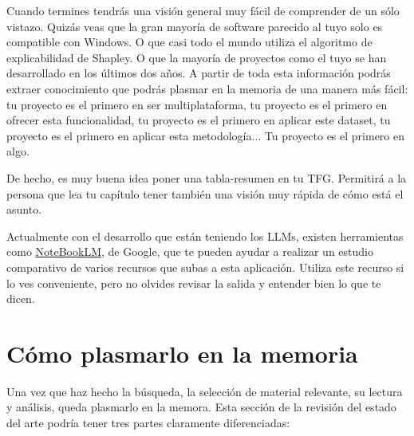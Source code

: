 Cuando termines tendrás una visión general muy fácil de comprender de un sólo vistazo. Quizás veas que la gran mayoría de software parecido al tuyo solo es compatible con Windows. O que casi todo el mundo utiliza el algoritmo de explicabilidad de Shapley. O que la mayoría de proyectos como el tuyo se han desarrollado en los últimos dos años. A partir de toda esta información podrás extraer conocimiento que podrás plasmar en la memoria de una manera más fácil: tu proyecto es el primero en ser multiplataforma, tu proyecto es el primero en ofrecer esta funcionalidad, tu proyecto es el primero en aplicar este dataset, tu proyecto es el primero en aplicar esta metodología... Tu proyecto es el primero en algo.

De hecho, es muy buena idea poner una tabla-resumen en tu TFG. Permitirá a la persona que lea tu capítulo tener también una visión muy rápida de cómo está el asunto.

Actualmente con el desarrollo que están teniendo los LLMs, existen herramientas como \href{https://notebooklm.google}{NoteBookLM}, de Google, que te pueden ayudar a realizar un estudio comparativo de varios recursos que subas a esta aplicación. Utiliza este recurso si lo ves conveniente, pero no olvides revisar la salida y entender bien lo que te dicen.

\section{Cómo plasmarlo en la memoria}

Una vez que haz hecho la búsqueda, la selección de material relevante, su lectura y análisis, queda plasmarlo en la memora. Esta sección de la revisión del estado del arte podría tener tres partes claramente diferenciadas:

